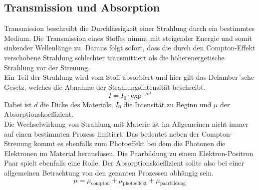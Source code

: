 \subsection{Transmission und Absorption}
Transmission beschreibt die Durchlässigkeit einer Strahlung durch ein bestimmtes Medium. Die Transmission eines Stoffes nimmt mit steigender 
Energie und somit sinkender Wellenlänge zu. Daraus folgt sofort, dass die durch den Compton-Effekt verschobene Strahlung schlechter transmittiert als die
höherenergetische Strahlung vor der Streuung.
\\
Ein Teil der Strahlung wird vom Stoff absorbiert und hier gilt das Delamber´sche Gesetz, welches die Abnahme der Strahlungsintensität beschreibt.
\begin{equation}
\label{eqn:delamber}
I = I_{0} \cdot \text{exp}^{-\mu d}
\end{equation}
Dabei ist $d$ die Dicke des Materials, $I_{0}$ die Intensität zu Beginn und $\mu$ der Absorptionskoeffizient.
\\
Die Wechselwirkung von Strahlung mit Materie ist im Allgemeinen nicht immer auf einen bestimmten Prozess limitiert. Das bedeutet neben der Compton-Streuung kommt
es ebenfalls zum Photoeffekt bei dem die Photonen die Elektronen im Material herauslösen. Die Paarbildung zu einem Elektron-Positron Paar spielt ebenfalls eine Rolle.
Der Absorptionskoeffizient sollte also bei einer allgemeinen Betrachtung von den genanten Prozessen abhängig sein.
\begin{equation*}
\mu = \mu_{\text{compton}} + \mu_{\text{photoeffekt}} + \mu_{\text{paarbildung}}
\end{equation*}

